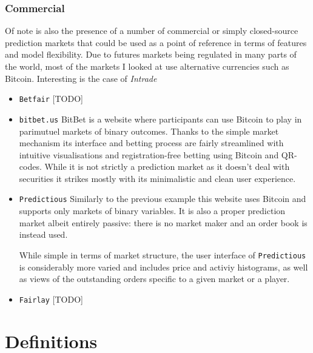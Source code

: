 \documentclass[bsc,frontabs,twoside,singlespacing,parskip,deptreport]{infthesis}     %
\begin{document}

\subsection{ Commercial }
	Of note is also the presence of a number of commercial or simply closed-source prediction markets that could be used as a point of reference in terms of features and model flexibility. Due to futures markets being regulated in many parts of the world, most of the markets I looked at use alternative currencies such as Bitcoin. Interesting is the case of {\em Intrade}
	
\begin{itemize}

\item {\tt Betfair}
    [TODO]
    
\item {\tt bitbet.us}
	BitBet is a website where participants can use Bitcoin to play in parimutuel markets of binary outcomes. Thanks to the simple market mechanism its interface and betting process are fairly streamlined with intuitive visualisations and registration-free betting using Bitcoin and QR-codes. While it is not strictly a prediction market as it doesn't deal with securities it strikes mostly with its minimalistic and clean user experience. 

\item {\tt Predictious}
	Similarly to the previous example this website uses Bitcoin and supports only markets of binary variables. It is also a proper prediction market albeit entirely passive: there is no market maker and an order book is instead used. 

	While simple in terms of market structure, the user interface of {\tt Predictious} is considerably more varied and includes price and activiy histograms, as well as views of the outstanding orders specific to a given market or a player. 


\item {\tt Fairlay}	
    [TODO]

\end{itemize}
\chapter{Definitions}
\end{document}
